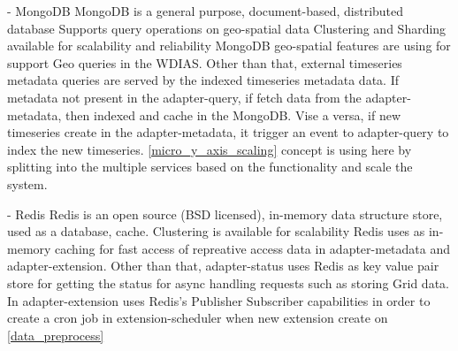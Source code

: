 - MongoDB
  MongoDB is a general purpose, document-based, distributed database
  Supports query operations on geo-spatial data \cite{mongodbMongoDBManual}
  Clustering and Sharding available for scalability and reliability
MongoDB geo-spatial features are using for support Geo queries in the WDIAS. Other than that, external timeseries metadata queries are served by the indexed timeseries metadata data.
If metadata not present in the adapter-query, if fetch data from the adapter-metadata, then indexed and cache in the MongoDB. Vise a versa, if new timeseries create in the adapter-metadata,
it trigger an event to adapter-query to index the new timeseries.
\ref{micro_y_axis_scaling} concept is using here by splitting into the multiple services based on the functionality and scale the system.

- Redis \cite{redisRedisDocumentation}
  Redis is an open source (BSD licensed), in-memory data structure store, used as a database, cache.
  Clustering is available for scalability
Redis uses as in-memory caching for fast access of repreative access data in adapter-metadata and adapter-extension.
Other than that, adapter-status uses Redis as key value pair store for getting the status for async handling requests such as storing Grid data.
In adapter-extension uses Redis's Publisher Subscriber capabilities in order to create a cron job in extension-scheduler when new extension create on \ref{data_preprocess}
